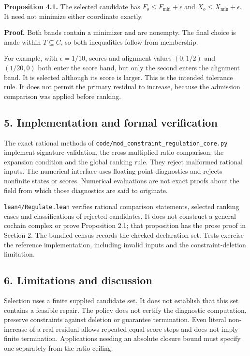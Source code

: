\documentclass[
]{article}
\begin{document}
\textbf{Proposition 4.1.} The selected candidate has
\(F_o\le F_{\min}+\epsilon\) and \(X_o\le X_{\min}+\epsilon\). It need
not minimize either coordinate exactly.

\textbf{Proof.} Both bands contain a minimizer and are nonempty. The
final choice is made within \(T\subseteq C\), so both inequalities
follow from membership.

For example, with \(\epsilon=1/10\), scores and alignment values
\((0,1/2)\) and \((1/20,0)\) both enter the score band, but only the
second enters the alignment band. It is selected although its score is
larger. This is the intended tolerance rule. It does not permit the
primary residual to increase, because the admission comparison was
applied before ranking.

\subsection{5. Implementation and formal
verification}\label{implementation-and-formal-verification}

The exact rational methods of
\nolinkurl{code/mod_constraint_regulation_core.py} implement signature
validation, the cross-multiplied ratio comparison, the expansion
condition and the global ranking rule. They reject malformed rational
inputs. The numerical interface uses floating-point diagnostics and
rejects nonfinite states or scores. Numerical evaluations are not exact
proofs about the field from which those diagnostics are said to
originate.

\nolinkurl{lean4/Regulate.lean} verifies rational comparison statements,
selected ranking cases and classifications of rejected candidates. It
does not construct a general cochain complex or prove Proposition 2.1;
that proposition has the prose proof in Section 2. The bundled census
records the checked declaration set. Tests exercise the reference
implementation, including invalid inputs and the constraint-deletion
limitation.

\subsection{6. Limitations and
discussion}\label{limitations-and-discussion}

Selection uses a finite supplied candidate set. It does not establish
that this set contains a feasible repair. The policy does not certify
the diagnostic computation, preserve constraints against deletion or
guarantee termination. Even literal non-increase of a real residual
allows repeated equal-score steps and does not imply finite termination.
Applications needing an absolute closure bound must specify one
separately from the ratio ceiling.
\end{document}
